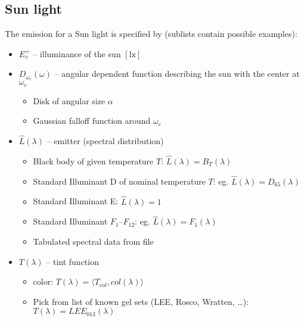 
\subsection{Sun light}

The emission for a Sun light is specified by (sublists contain possible examples):

\begin{itemize}
\item $E^+_v$ -- illuminance of the sun $[\si{\lux}]$
\item $D_{\omega_c}(\omega)$ -- angular dependent function describing the sun with the center at $\omega_c$
	\begin{itemize} \small\it
	\item Disk of angular size $\alpha$
	\item Gaussian falloff function around $\omega_c$
	\end{itemize}
\item $\hat{L}(\lambda)$ -- emitter (spectral distribution)
  \begin{itemize}\small\it
  \item Black body of given temperature $T$: $\hat L(\lambda) = B_T(\lambda)$
  \item Standard Illuminant D of nominal temperature $T$: eg. $\hat L(\lambda) = D_{65}(\lambda)$
  \item Standard Illuminant E: $\hat L(\lambda) = 1$
  \item Standard Illuminant $F_1$--$F_{12}$: eg. $\hat L(\lambda) = F_1(\lambda)$
  \item Tabulated spectral data from file
  \end{itemize}
\item $T(\lambda)$ -- tint function
  \begin{itemize}\small\it
  \item color: $T(\lambda) = \langle T_{col}, col(\lambda) \rangle$
  \item Pick from list of known gel sets (LEE, Rosco, Wratten, \ldots): $T(\lambda) = LEE_{013} (\lambda)$
  \end{itemize}
\end{itemize}

